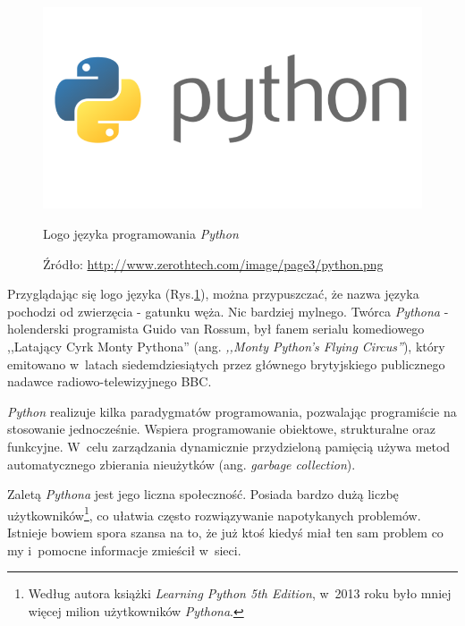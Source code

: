 \documentclass[a4paper,12pt,oneside]{mwrep}  %
\begin{document}
\begin{figure}[h]
\centering
\includegraphics[width=1\textwidth/2]{grafika/loga/python.png}
\caption{Logo języka programowania \emph{Python}}
\vspace{-0.8cm}
\caption*{\scriptsize Źródło: \url{http://www.zerothtech.com/image/page3/python.png}}
\label{logo_python}
\end{figure}

Przyglądając się logo języka (Rys.\ref{logo_python}), można przypuszczać, że nazwa języka pochodzi od zwierzęcia - gatunku węża. Nic bardziej mylnego. Twórca \emph{Pythona} - holenderski programista Guido van Rossum, był fanem serialu komediowego ,,Latający Cyrk Monty Pythona'' (ang. \emph{,,Monty Python's Flying Circus''}), który emitowano w~latach siedemdziesiątych przez głównego brytyjskiego publicznego nadawce radiowo-telewizyjnego BBC. %

\emph{Python} realizuje kilka paradygmatów programowania, pozwalając programiście na stosowanie jednocześnie. Wspiera programowanie obiektowe, strukturalne oraz funkcyjne. W~celu zarządzania dynamicznie przydzieloną pamięcią używa metod automatycznego zbierania nieużytków (ang. \emph{garbage collection}).

Zaletą \emph{Pythona} jest jego liczna społeczność. Posiada bardzo dużą liczbę użytkowników\footnote{Według autora książki \emph{Learning Python 5th Edition}, w~2013 roku było mniej więcej milion użytkowników \emph{Pythona}.\cite{learning-python}}, co ułatwia często rozwiązywanie napotykanych problemów. Istnieje bowiem spora szansa na to, że już ktoś kiedyś miał ten sam problem co my i~pomocne informacje zmieścił w~sieci.
\end{document}
